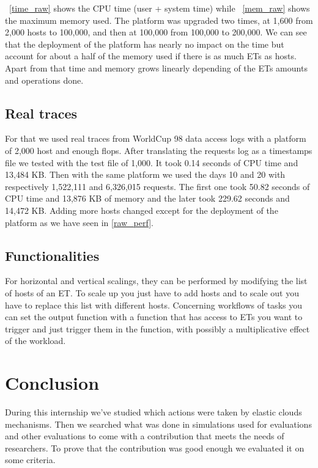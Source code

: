 \documentclass[a4paper, onecolumn]{article}
\begin{document}
    \figurename~\ref{time_raw} shows the CPU time (user + system time) while 
    \figurename~\ref{mem_raw} shows the maximum memory used. The platform was
    upgraded two times, at 1,600 from 2,000 hosts to 100,000, and then at
    100,000 from 100,000 to 200,000. We can see that the deployment of the 
    platform has nearly no impact on the time but account for about a half of 
    the memory used if there is as much ETs as hosts. Apart from that time and 
    memory grows linearly depending of the ETs amounts and operations done.
    
    
  \subsection{Real traces}
    For that we used real traces from WorldCup 98 data access logs \cite{wc98}
    with a platform of 2,000 host and enough flops. After translating the
    requests log as a timestamps file we tested with the test file of 1,000. It
    took 0.14 seconds of CPU time and 13,484 KB. Then with the same platform we
    used the days 10 and 20 with respectively 1,522,111 and 6,326,015 requests.
    The first one took 50.82 seconds of CPU time and 13,876 KB of memory and
    the later took 229.62 seconds and 14,472 KB. Adding more hosts changed 
    except for the deployment of the platform as we have seen in \ref{raw_perf}.
  
  \subsection{Functionalities}
   For horizontal and vertical scalings, they can be performed by modifying the 
   list of hosts of an ET. To scale up you just have to add hosts and to scale 
   out you have to replace this list with different hosts. Concerning workflows 
   of tasks you can set the output function with a function that has access to 
   ETs you want to trigger and just trigger them in the function, with possibly 
   a multiplicative effect of the workload.
  

  

\section{Conclusion} \label{conclu}
During this internship we've studied which actions were taken by elastic clouds 
mechanisms. Then we searched what was done in simulations used for evaluations 
and other evaluations to come with a contribution that meets the needs of 
researchers. To prove that the contribution was good enough we evaluated it on 
some criteria.





\end{document}
